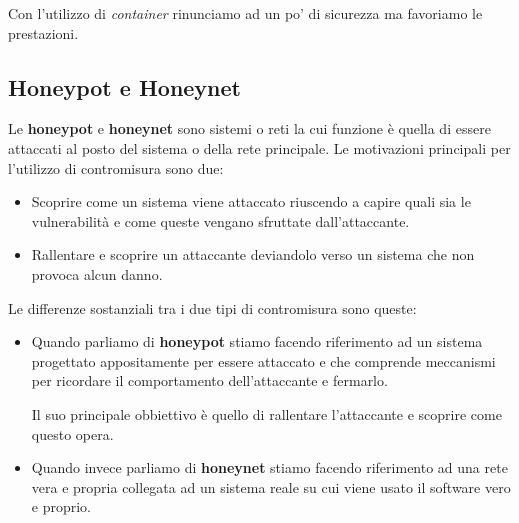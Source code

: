 Con l'utilizzo di \emph{container} rinunciamo ad un po' di sicurezza ma favoriamo le prestazioni.

\subsection{Honeypot e Honeynet}
Le \textbf{honeypot} e \textbf{honeynet} sono sistemi o reti la cui funzione è quella di essere attaccati al posto del
sistema o della rete principale. Le motivazioni principali per l'utilizzo di contromisura sono due:
\begin{itemize}
	\item Scoprire come un sistema viene attaccato riuscendo a capire quali sia le vulnerabilità e come queste vengano
	      sfruttate dall'attaccante.
	\item Rallentare e scoprire un attaccante deviandolo verso un sistema che non provoca alcun danno.
\end{itemize}

Le differenze sostanziali tra i due tipi di contromisura sono queste:
\begin{itemize}
	\item Quando parliamo di \textbf{honeypot} stiamo facendo riferimento ad un sistema progettato appositamente per
	      essere attaccato e che comprende meccanismi per ricordare il comportamento dell'attaccante e fermarlo.

	      Il suo principale obbiettivo è quello di rallentare l'attaccante e scoprire come questo opera.
	\item Quando invece parliamo di \textbf{honeynet} stiamo facendo riferimento ad una rete vera e propria collegata
	      ad un sistema reale su cui viene usato il software vero e proprio.
\end{itemize}

